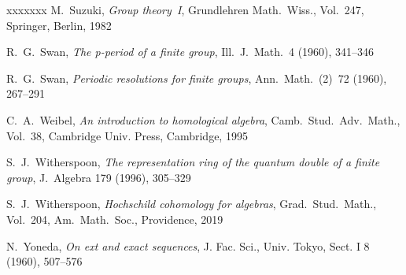 \documentclass[12pt]{article}
\theoremstyle{definition}
\theoremstyle{break}
\renewcommand{\1}{\mathbbm{1}}
\begin{document}
\begin{thebibliography}{xxxxxxx}
 M.~Suzuki,
\emph{Group theory~I},
Grundlehren Math.\ Wiss., Vol.~247, Springer, Berlin, 1982

R.~G.~Swan,
\emph{The p-period of a finite group},
Ill.~J.~Math.~4 (1960), 341--346

R.~G.~Swan,
\emph{Periodic resolutions for finite groups},
Ann.~Math.~(2)~72 (1960), 267--291

C.~A.~Weibel,
\emph{An introduction to homological algebra},
Camb.~Stud.\ Adv.\ Math., Vol.~38, Cambridge Univ. Press, Cambridge, 1995

 S.~J.~Witherspoon,
\emph{The representation ring of the quantum double of a finite group}, J.~Algebra 179 (1996), 305--329

 S.~J.~Witherspoon,
\emph{Hochschild cohomology for algebras},
Grad.~Stud.\ Math., Vol.~204, Am.~Math.~Soc., Providence, 2019

 N.~Yoneda,
\emph{On ext and exact sequences},
J. Fac. Sci., Univ. Tokyo, Sect. I 8  (1960), 507--576
\end{thebibliography}
\end{document}
